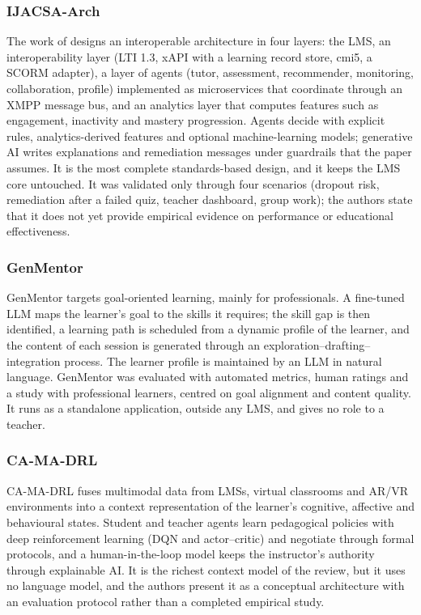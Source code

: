 \subsubsection{IJACSA-Arch}
The work of \citet{khaddar2026ijacsa} designs an
interoperable architecture in four layers: the LMS, an interoperability
layer (LTI 1.3, xAPI with a learning record store, cmi5, a SCORM adapter),
a layer of agents (tutor, assessment, recommender, monitoring,
collaboration, profile) implemented as microservices that coordinate
through an XMPP message bus, and an analytics layer that computes features
such as engagement, inactivity and mastery progression. Agents decide with
explicit rules, analytics-derived features and optional machine-learning
models; generative AI writes explanations and remediation messages under
guardrails that the paper assumes. It is the most complete
standards-based design, and it keeps the LMS core untouched. It was
validated only through four scenarios (dropout risk, remediation after a
failed quiz, teacher dashboard, group work); the authors state that it
does not yet provide empirical evidence on performance or educational
effectiveness.

\subsubsection{GenMentor}
GenMentor \cite{wang2025genmentor} targets
goal-oriented learning, mainly for professionals. A fine-tuned LLM maps
the learner's goal to the skills it requires; the skill gap is then
identified, a learning path is scheduled from a dynamic profile of the
learner, and the content of each session is generated through an
exploration--drafting--integration process. The learner profile is
maintained by an LLM in natural language. GenMentor was evaluated with
automated metrics, human ratings and a study with professional learners,
centred on goal alignment and content quality. It runs as a standalone
application, outside any LMS, and gives no role to a teacher.

\subsubsection{CA-MA-DRL}
CA-MA-DRL \cite{sharif2026camadrl} fuses
multimodal data from LMSs, virtual classrooms and AR/VR environments into
a context representation of the learner's cognitive, affective and
behavioural states. Student and teacher agents learn pedagogical policies
with deep reinforcement learning (DQN and actor--critic) and negotiate
through formal protocols, and a human-in-the-loop model keeps the
instructor's authority through explainable AI. It is the richest context
model of the review, but it uses no language model, and the authors
present it as a conceptual architecture with an evaluation protocol rather
than a completed empirical study.

